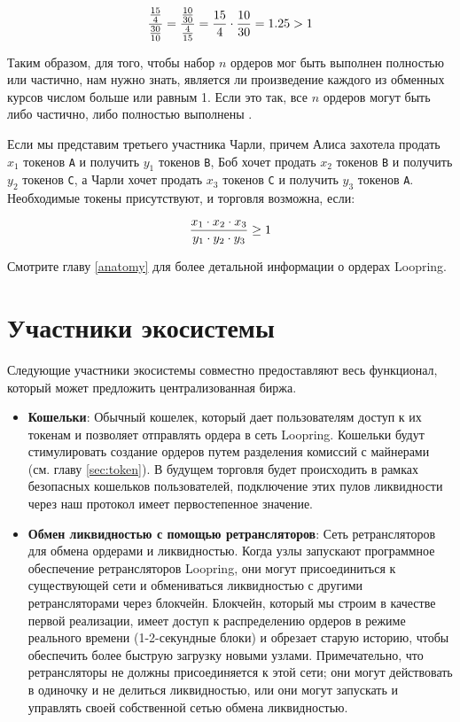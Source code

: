 \documentclass[utf8,nofonts]{article}
\begin{document}
\begin{multicols}{2}
	\begin{equation}
	{{15\over 4} \over {30\over 10}} = {{10\over 30} \over {4\over 15}}={15 \over 4} \cdot {10 \over 30} = 1.25 > 1
	\end{equation}
	
	Таким образом, для того, чтобы набор $ n $ ордеров мог быть выполнен полностью или частично, нам нужно знать, является ли произведение каждого из обменных курсов числом больше или равным 1. Если это так, все $ n $ ордеров могут быть либо частично, либо полностью выполнены \cite{supersymmetry}.
	
	Если мы представим третьего участника Чарли, причем Алиса захотела продать $ x_1 $ токенов \verb|A| и получить $ y_1 $ токенов \verb|B|, Боб хочет продать $ x_2 $ токенов \verb|B| и получить $ y_2 $ токенов \verb|С|, а Чарли хочет продать $ x_3 $ токенов \verb|С| и получить $ y_3 $ токенов \verb|A|. Необходимые токены присутствуют, и торговля возможна, если:
	
	\begin{equation}
	{{x_1 \cdot x_2 \cdot x_3 \over y_1 \cdot y_2 \cdot y_3} \geq 1}
	\end{equation}
	
	
	Смотрите главу \ref{anatomy} для более детальной информации о ордерах Loopring.
	
	
	
	\section{Участники экосистемы\label{sec:ecosystem}}
	Следующие участники экосистемы совместно предоставляют весь функционал, который может предложить централизованная биржа. 
	
	\begin{itemize}
		
		\item \textbf{Кошельки}: Обычный кошелек, который дает пользователям доступ к их токенам и позволяет отправлять ордера в сеть Loopring. Кошельки будут стимулировать создание ордеров путем разделения комиссий с майнерами (см. главу \ref{sec:token}). В будущем торговля будет происходить в рамках безопасных кошельков пользователей, подключение этих пулов ликвидности через наш протокол имеет первостепенное значение.
		
		\item \textbf{Обмен ликвидностью с помощью ретрансляторов}: Сеть ретрансляторов для обмена ордерами и ликвидностью. Когда узлы запускают программное обеспечение ретрансляторов Loopring, они могут присоединиться к существующей сети и обмениваться ликвидностью с другими ретрансляторами через блокчейн. Блокчейн, который мы строим в качестве первой реализации, имеет доступ к распределению ордеров в режиме реального времени (1-2-секундные блоки) и обрезает старую историю, чтобы обеспечить более быструю загрузку новыми узлами. Примечательно, что ретрансляторы не должны присоединяется к этой сети; они могут действовать в одиночку и не делиться ликвидностью, или они могут запускать и управлять своей собственной сетью обмена ликвидностью.
		

\end{itemize}
\end{multicols}
\end{document}
